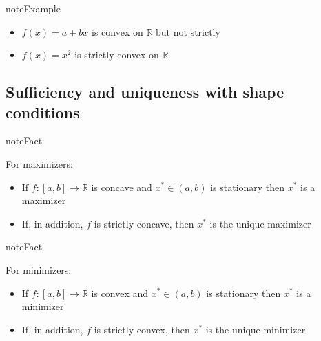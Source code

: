 \documentclass[letterpaper,10pt,english]{jupyterBook}
\begin{document}
\begin{sphinxadmonition}{note}{Example}
\begin{itemize}
\item {} 
\sphinxAtStartPar
\(f(x) = a + b x\) is convex on \(\mathbb{R}\) but not strictly

\item {} 
\sphinxAtStartPar
\(f(x) = x^2\) is strictly convex on \(\mathbb{R}\)

\end{itemize}
\end{sphinxadmonition}


\subsection{Sufficiency and uniqueness with shape conditions}
\label{\detokenize{02.optimization_intro:sufficiency-and-uniqueness-with-shape-conditions}}
\begin{sphinxadmonition}{note}{Fact}

\sphinxAtStartPar
For maximizers:
\begin{itemize}
\item {} 
\sphinxAtStartPar
If \(f \colon [a,b] \to \mathbb{R}\) is concave and \(x^* \in (a, b)\) is
stationary then \(x^*\) is a maximizer

\item {} 
\sphinxAtStartPar
If, in addition, \(f\) is strictly concave, then \(x^*\) is the
unique maximizer

\end{itemize}
\end{sphinxadmonition}

\begin{sphinxadmonition}{note}{Fact}

\sphinxAtStartPar
For minimizers:
\begin{itemize}
\item {} 
\sphinxAtStartPar
If \(f \colon [a,b] \to \mathbb{R}\) is convex and \(x^* \in (a, b)\) is
stationary then \(x^*\) is a minimizer

\item {} 
\sphinxAtStartPar
If, in addition, \(f\) is strictly convex, then \(x^*\) is the
unique minimizer

\end{itemize}
\end{sphinxadmonition}
\end{document}

